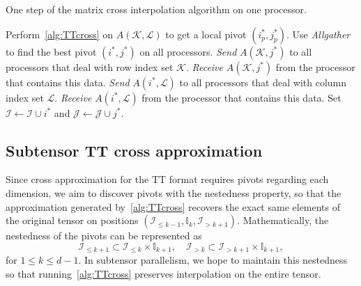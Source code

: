 \documentclass[11pt,a4paper,review]{siamart220329}
\begin{document}
\begin{algorithm}
\caption{One step of the matrix cross interpolation algorithm on one processor.}
\begin{algorithmic}[1]
\label{alg:submatrixCross}
\State Perform~\cref{alg:TTcross} on $A(\mathcal{K},\mathcal{L})$ to get a local pivot $(i^*_p,j^*_p)$.
\State Use \textit{Allgather} to find the best pivot $(i^*,j^*)$ on all processors.
\State \textit{Send} $A(\mathcal{K},j^*)$ to all processors that deal with row index set $\mathcal{K}$.
\Else
\State \textit{Receive} $A(\mathcal{K},j^*)$ from the processor that contains this data.
\EndIf
{}
\State \textit{Send} $A(i^*,\mathcal{L})$ to all processors that deal with column index set $\mathcal{L}$.
\Else
\State \textit{Receive} $A(i^*,\mathcal{L})$ from the processor that contains this data.
\EndIf
\State Set $\mathcal{I} \leftarrow \mathcal{I}\cup i^*$ and $\mathcal{J} \leftarrow \mathcal{J}\cup j^*$.
\end{algorithmic}   
\end{algorithm}

\subsection{Subtensor TT cross approximation}
Since cross approximation for the TT format requires pivots regarding each dimension, we aim to discover pivots with the nestedness property, so that the approximation generated by~\cref{alg:TTcross} recovers the exact same elements of the original tensor on positions $(\mathcal{I}_{\le k-1},\mathbb{I}_k,\mathcal{I}_{>k+1})$. Mathematically, the nestedness of the pivots can be represented as
\begin{equation} \label{eq:nestedpivots}
\mathcal{I}_{\le k+1} \subset \mathcal{I}_{\le k} \times \mathbb{I}_{k+1}, \quad \mathcal{I}_{>k} \subset \mathcal{I}_{>k+1} \times \mathbb{I}_{k+1},
\end{equation}
for $1 \le k \le d-1$. In subtensor parallelism, we hope to maintain this nestedness so that running~\cref{alg:TTcross} preserves interpolation on the entire tensor.
\end{document}
